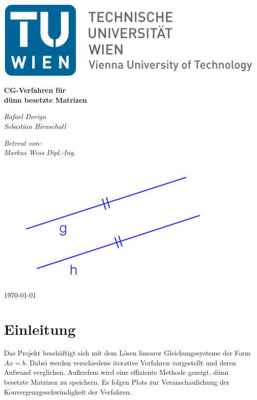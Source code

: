 \documentclass[12pt,a4paper]{scrartcl}
\author{Rafael Dorigo, Sebastian Hirnschall}
\date{\today}
\numberwithin{equation}{section}
\numberwithin{myalgctr}{section}
\numberwithin{mytheoremctr}{subsection}
\numberwithin{mykorollarctr}{subsection}
\numberwithin{mylemmactr}{subsection}
\numberwithin{mybeispielctr}{subsection}
\begin{document}
	\begin{titlepage}
		\begin{flushleft}
				\includegraphics[width=.4\linewidth]{tuwien.png}
		\end{flushleft}	
		\centering
		
		
		\vspace{5cm}
		{\huge\bfseries CG-Verfahren f\"ur \\dünn besetzte Matrizen\par}
		\vspace{2cm}
		{\Large\itshape Rafael Dorigo\\Sebastian Hirnschall\par}
		\vspace{1cm}
		{\large\itshape Betreut von:\\Markus Wess Dipl.-Ing.\par}
		\vspace{1cm}
		\begin{figure}[!h]
			\vspace{0cm}
			\centering
			\includegraphics[width=.4\linewidth]{titelbild2.png}
		\end{figure}
		
		\vfill
		
		{\today\par}
	\end{titlepage}
	\restoregeometry
	
	\thispagestyle{firststyle}
	
	\newpage\noindent

	\thispagestyle{firststyle}
	
	\newpage
	\tableofcontents
	\thispagestyle{general}
	\newpage

	\section{Einleitung}
	Das Projekt beschäftigt sich mit dem Lösen linearer Gleichungssysteme der Form $Ax = b$. Dabei werden verschiedene iterative Verfahren vorgestellt und deren Aufwand verglichen. Außerdem wird eine effiziente Methode gezeigt, dünn besetzte Matrizen zu speichern. Es folgen Plots zur Veranschaulichung der Konvergenzgeschwindigkeit der Verfahren.
	\newpage
	
\end{document}
